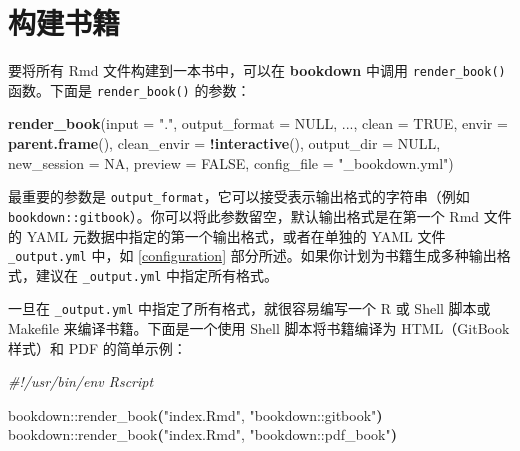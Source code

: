 \documentclass[
  12pt,
]{krantz}
\newenvironment{Shaded}{\begin{snugshade}}{\end{snugshade}}
\newcommand{\AttributeTok}[1]{\textcolor[rgb]{0.13,0.29,0.53}{#1}}
\newcommand{\CommentTok}[1]{\textcolor[rgb]{0.56,0.35,0.01}{\textit{#1}}}
\newcommand{\ConstantTok}[1]{\textcolor[rgb]{0.56,0.35,0.01}{#1}}
\newcommand{\ErrorTok}[1]{\textcolor[rgb]{0.64,0.00,0.00}{\textbf{#1}}}
\newcommand{\ExtensionTok}[1]{#1}
\newcommand{\FunctionTok}[1]{\textcolor[rgb]{0.13,0.29,0.53}{\textbf{#1}}}
\newcommand{\KeywordTok}[1]{\textcolor[rgb]{0.13,0.29,0.53}{\textbf{#1}}}
\newcommand{\NormalTok}[1]{#1}
\newcommand{\SpecialCharTok}[1]{\textcolor[rgb]{0.81,0.36,0.00}{\textbf{#1}}}
\newcommand{\StringTok}[1]{\textcolor[rgb]{0.31,0.60,0.02}{#1}}
\theoremstyle{definition}
\theoremstyle{definition}
\theoremstyle{definition}
\theoremstyle{definition}
\theoremstyle{remark}
\begin{document}
\hypertarget{build-the-book}{%
\section{构建书籍}\label{build-the-book}}

要将所有 Rmd 文件构建到一本书中，可以在 \textbf{bookdown} 中调用 \texttt{render\_book()}函数。下面是 \texttt{render\_book()} 的参数：

\begin{Shaded}
\begin{Highlighting}[]
\FunctionTok{render\_book}\NormalTok{(}\AttributeTok{input =} \StringTok{"."}\NormalTok{, }\AttributeTok{output\_format =} \ConstantTok{NULL}\NormalTok{, ...,}
  \AttributeTok{clean =} \ConstantTok{TRUE}\NormalTok{, }\AttributeTok{envir =} \FunctionTok{parent.frame}\NormalTok{(),}
  \AttributeTok{clean\_envir =} \SpecialCharTok{!}\FunctionTok{interactive}\NormalTok{(), }\AttributeTok{output\_dir =} \ConstantTok{NULL}\NormalTok{,}
  \AttributeTok{new\_session =} \ConstantTok{NA}\NormalTok{, }\AttributeTok{preview =} \ConstantTok{FALSE}\NormalTok{,}
  \AttributeTok{config\_file =} \StringTok{"\_bookdown.yml"}\NormalTok{)}
\end{Highlighting}
\end{Shaded}

最重要的参数是 \texttt{output\_format}，它可以接受表示输出格式的字符串（例如 \texttt{\textquotesingle{}bookdown::gitbook\textquotesingle{}}）。你可以将此参数留空，默认输出格式是在第一个 Rmd 文件的 YAML 元数据中指定的第一个输出格式，或者在单独的 YAML 文件 \texttt{\_output.yml} 中，如 \ref{configuration} 部分所述。如果你计划为书籍生成多种输出格式，建议在 \texttt{\_output.yml} 中指定所有格式。

一旦在 \texttt{\_output.yml} 中指定了所有格式，就很容易编写一个 R 或 Shell 脚本或 Makefile 来编译书籍。下面是一个使用 Shell 脚本将书籍编译为 HTML（GitBook 样式）和 PDF 的简单示例：

\begin{Shaded}
\begin{Highlighting}[]
\CommentTok{\#!/usr/bin/env Rscript}

\ExtensionTok{bookdown::render\_book}\ErrorTok{(}\StringTok{"index.Rmd"}\ExtensionTok{,} \StringTok{"bookdown::gitbook"}\KeywordTok{)}
\ExtensionTok{bookdown::render\_book}\ErrorTok{(}\StringTok{"index.Rmd"}\ExtensionTok{,} \StringTok{"bookdown::pdf\_book"}\KeywordTok{)}
\end{Highlighting}
\end{Shaded}
\end{document}
